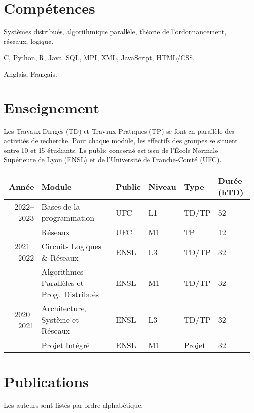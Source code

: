 \documentclass[12pt]{article}
\newcounter{cvitems}
\newcommand{\cvitem}[2]{\item[#1] #2}
\begin{document}
\section*{Compétences}

\begin{cvitems}
  \cvitem{Académiques}{Systèmes distribués, algorithmique parallèle, théorie de
  l'ordonnancement, réseaux, logique.}

  \cvitem{Techniques}{C, Python, R, Java, SQL, MPI, XML, JavaScript, HTML/CSS.}

  \cvitem{Linguistiques}{Anglais, Français.}
\end{cvitems}

\section*{Enseignement}

Les Travaux Dirigés (TD) et Travaux Pratiques (TP) se font en parallèle des activités de recherche.  
Pour chaque module, les effectifs des groupes se situent entre 10 et 15 étudiants.  
Le public concerné est issu de l'École Normale Supérieure de Lyon (ENSL) et de l'Université de
Franche-Comté (UFC).

\begin{center}
  \footnotesize
  \begin{tabularx}{\textwidth}{rXllll}
    \toprule
    Année & Module & Public & Niveau & Type & Durée (hTD) \tabularnewline
    \midrule
    2022--2023 & Bases de la programmation & UFC & L1 & TD/TP & 52 \tabularnewline
    & Réseaux & UFC & M1 & TP & 12 \tabularnewline
    \midrule
    2021--2022 & Circuits Logiques \& Réseaux & ENSL & L3 & TD/TP & 32 \tabularnewline
    & Algorithmes Parallèles et Prog.\ Distribués & ENSL & M1 & TD/TP & 32 \tabularnewline
    \midrule
    2020--2021 & Architecture, Système et Réseaux & ENSL & L3 & TD/TP & 32 \tabularnewline
    & Projet Intégré & ENSL & M1 & Projet & 32 \tabularnewline
    \bottomrule
  \end{tabularx}
\end{center}

\section*{Publications}

Les auteurs sont listés par ordre alphabétique.

\nocite{*}

\newcommand{\showbib}[1]{%
  \begin{otherlanguage}{english}
    \printbibliography[heading=none,keyword={#1}]
  \end{otherlanguage}}
\end{document}
